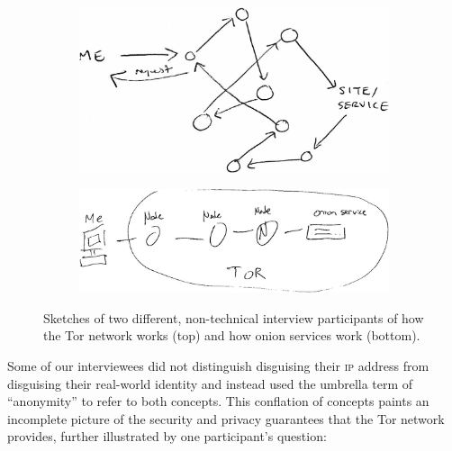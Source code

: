 \begin{figure}[t]
    \centering

    \begin{subfigure}[t]{\linewidth}
        \centering
        \includegraphics[width=0.8\linewidth]{figures/tor-sketch.jpg}
        \label{fig:tor-sketch}
    \end{subfigure}

    \begin{subfigure}[t]{\linewidth}
        \centering
        \includegraphics[width=0.8\linewidth]{figures/os-sketch.jpg}
        \label{fig:os-sketch}
    \end{subfigure}

    \caption{Sketches of two different, non-technical interview participants of
    how the Tor network works (top) and how onion services work (bottom).}
\end{figure}

Some of our interviewees did not distinguish disguising their \textsc{ip}
address from disguising their real-world identity and instead used the umbrella
term of ``anonymity'' to refer to both concepts.  This conflation of concepts
paints an incomplete picture of the security and privacy guarantees that the Tor
network provides, further illustrated by one participant's question:

